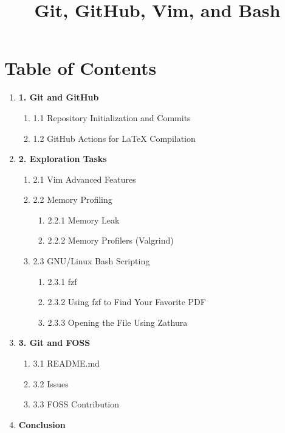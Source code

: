 \documentclass[12pt]{article}
\title{Git, GitHub, Vim, and Bash}
\author{}
\date{}
\begin{document}
\maketitle

\section*{Table of Contents}
\begin{enumerate}
    \item \textbf{1. Git and GitHub}
    \begin{enumerate}
        \item 1.1 Repository Initialization and Commits
        \item 1.2 GitHub Actions for LaTeX Compilation
    \end{enumerate}
    \item \textbf{2. Exploration Tasks}
    \begin{enumerate}
        \item 2.1 Vim Advanced Features
        \item 2.2 Memory Profiling
        \begin{enumerate}
            \item 2.2.1 Memory Leak
            \item 2.2.2 Memory Profilers (Valgrind)
        \end{enumerate}
        \item 2.3 GNU/Linux Bash Scripting
        \begin{enumerate}
            \item 2.3.1 fzf
            \item 2.3.2 Using fzf to Find Your Favorite PDF
            \item 2.3.3 Opening the File Using Zathura
        \end{enumerate}
    \end{enumerate}
    \item \textbf{3. Git and FOSS}
    \begin{enumerate}
        \item 3.1 README.md
        \item 3.2 Issues
        \item 3.3 FOSS Contribution
    \end{enumerate}
    \item \textbf{Conclusion}
\end{enumerate}
\end{document}
